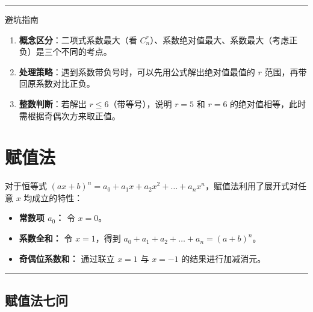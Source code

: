 \documentclass[11pt,a4paper]{article}
\begin{document}
\medskip
\hrule
\medskip

\begin{mybox}{避坑指南}
    \begin{enumerate}[label=\small\alph*.]
        \item \textbf{概念区分}：二项式系数最大（看 $C_n^r$）、系数绝对值最大、系数最大（考虑正负）是三个不同的考点。
        \item \textbf{处理策略}：遇到系数带负号时，可以先用公式解出绝对值最值的 $r$ 范围，再带回原系数对比正负。
        \item \textbf{整数判断}：若解出 $r \leq 6$（带等号），说明 $r=5$ 和 $r=6$ 的绝对值相等，此时需根据奇偶次方来取正值。
    \end{enumerate}
\end{mybox}


\newpage



\section{赋值法}


对于恒等式 $(ax+b)^n = a_0 + a_1x + a_2x^2 + \dots + a_nx^n$，赋值法利用了展开式对任意 $x$ 均成立的特性：
\begin{itemize}
    \item \textbf{常数项 $a_0$：} 令 $x = 0$。
    \item \textbf{系数全和：} 令 $x = 1$，得到 $a_0 + a_1 + a_2 + \dots + a_n = (a+b)^n$。
    \item \textbf{奇偶位系数和：} 通过联立 $x=1$ 与 $x=-1$ 的结果进行加减消元。
\end{itemize}

\medskip
\hrule
\medskip

\subsection{赋值法七问}
\end{document}
